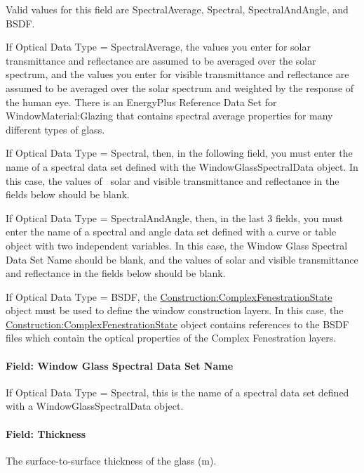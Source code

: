 Valid values for this field are SpectralAverage, Spectral, SpectralAndAngle, and BSDF.

If Optical Data Type = SpectralAverage, the values you enter for solar transmittance and reflectance are assumed to be averaged over the solar spectrum, and the values you enter for visible transmittance and reflectance are assumed to be averaged over the solar spectrum and weighted by the response of~ the human eye. There is an EnergyPlus Reference Data Set for WindowMaterial:Glazing that contains spectral average properties for many different types of glass.

If Optical Data Type = Spectral, then, in the following field, you must enter the name of a spectral data set defined with the WindowGlassSpectralData object. In this case, the values of~ solar and visible transmittance and reflectance in the fields below should be blank.

If Optical Data Type = SpectralAndAngle, then, in the last 3 fields, you must enter the name of a spectral and angle data set defined with a curve or table object with two independent variables. In this case, the Window Glass Spectral Data Set Name should be blank, and the values of solar and visible transmittance and reflectance in the fields below should be blank.

If Optical Data Type = BSDF, the \hyperref[constructioncomplexfenestrationstate]{Construction:ComplexFenestrationState} object must be used to define the window construction layers. In this case, the \hyperref[constructioncomplexfenestrationstate]{Construction:ComplexFenestrationState} object contains references to the BSDF files which contain the optical properties of the Complex Fenestration layers.

\paragraph{Field: Window Glass Spectral Data Set Name}\label{field-window-glass-spectral-data-set-name}

If Optical Data Type = Spectral, this is the name of a spectral data set defined with a WindowGlassSpectralData object.

\paragraph{Field: Thickness}\label{field-thickness-1}

The surface-to-surface thickness of the glass (m).

